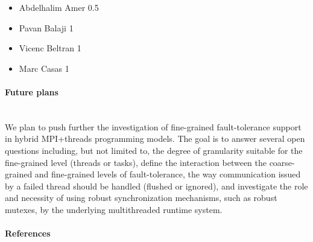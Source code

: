 \begin{refsection}
\begin{itemize}
\item Abdelhalim Amer 0.5
\item Pavan Balaji 1
\item Vicenc Beltran 1
\item Marc Casas 1
\end{itemize}

\paragraph{Future plans}~\\

We plan to push further the investigation of fine-grained fault-tolerance
support in hybrid MPI+threads programming models. The goal is to answer several
open questions including, but not limited to, the degree of granularity suitable for
the fine-grained level (threads or tasks), define the interaction between the
coarse-grained and fine-grained levels of fault-tolerance, the way communication issued by a
failed thread should be handled (flushed or ignored), and investigate the role and necessity of using
robust synchronization mechanisms, such as robust mutexes, by the underlying
multithreaded runtime system.

\paragraph{References}~\\


\printbibliography[heading=none,notkeyword=own]

\end{refsection}

